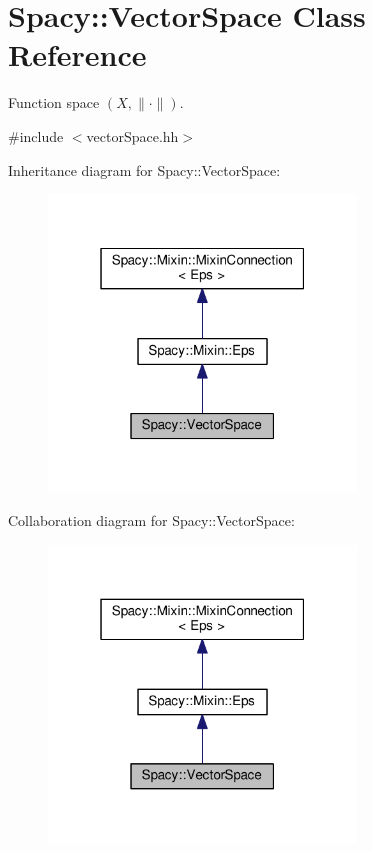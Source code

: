 \hypertarget{classSpacy_1_1VectorSpace}{\section{Spacy\-:\-:Vector\-Space Class Reference}
\label{classSpacy_1_1VectorSpace}
}


Function space $(X,\|\cdot\|)$.  




{\ttfamily \#include $<$vector\-Space.\-hh$>$}



Inheritance diagram for Spacy\-:\-:Vector\-Space\-:
\nopagebreak
\begin{figure}[H]
\begin{center}
\leavevmode
\includegraphics[width=232pt]{classSpacy_1_1VectorSpace__inherit__graph}
\end{center}
\end{figure}


Collaboration diagram for Spacy\-:\-:Vector\-Space\-:
\nopagebreak
\begin{figure}[H]
\begin{center}
\leavevmode
\includegraphics[width=232pt]{classSpacy_1_1VectorSpace__coll__graph}
\end{center}
\end{figure}
